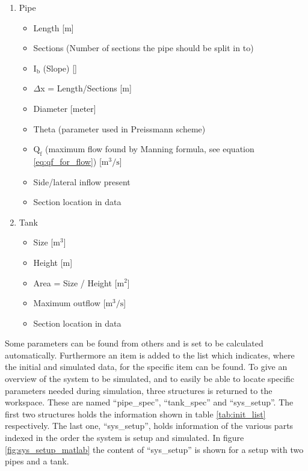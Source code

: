 {\begin{enumerate} \label{tab:init_list}
	\item Pipe
	\begin{itemize}
		\item Length [m]
		\item Sections (Number of sections the pipe should be split in to)
		\item $\text{I}_\text{b}$ (Slope) [\textperthousand]
		\item $\Delta$x = Length/Sections [m]
		\item Diameter [meter]
		\item Theta (parameter used in Preissmann scheme)
		\item $\text{Q}_{\text{f}}$ (maximum flow found by Manning formula, see equation \ref{eq:qf_for_flow}) [$\text{m}^\text{3}/\text{s}$]
		\item Side/lateral inflow present 
		\item Section location in data 
	\end{itemize}
	\item Tank
	\begin{itemize}
		\item Size [$\text{m}^\text{3}$]
		\item Height [m]
		\item Area = Size / Height [$\text{m}^\text{2}$]
		\item Maximum outflow [$\text{m}^\text{3}/\text{s}$]
		\item Section location in data 
	\end{itemize}
\end{enumerate}

Some parameters can be found from others and is set to be calculated automatically. 
Furthermore an item is added to the list which indicates, where the initial and simulated data, for the specific item can be found.
To give an overview of the system to be simulated, and to easily be able to locate specific parameters needed during simulation, three structures is returned to the workspace. These are named ``pipe\_spec'', ``tank\_spec'' and ``sys\_setup''. The first two structures holds the information shown in table \ref{tab:init_list} respectively. The last one, ``sys\_setup'', holds information of the various parts indexed in the order the system is setup and simulated. In figure \ref{fig:sys_setup_matlab} the content of ``sys\_setup'' is shown for a setup with two pipes and a tank.

}
